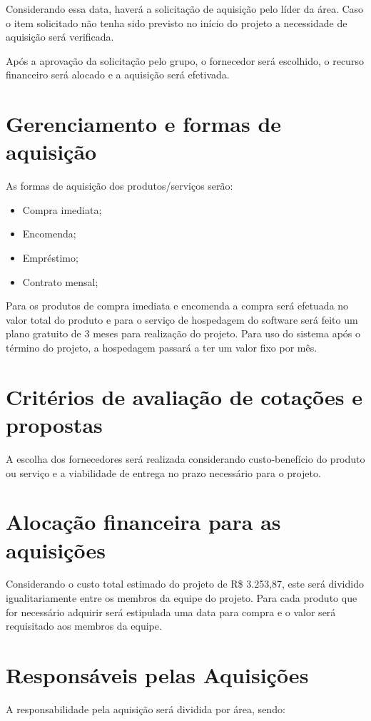 \begin{apendicesenv}
Considerando essa data, haverá a solicitação de aquisição pelo líder da área. Caso o item solicitado não tenha sido previsto no início do projeto a necessidade de aquisição será verificada. 

Após a aprovação da solicitação pelo grupo, o fornecedor será escolhido, o recurso financeiro será alocado e a aquisição será efetivada.

\section*{Gerenciamento e formas de aquisição}
As formas de aquisição dos produtos/serviços serão:
\begin{itemize}
	\item Compra imediata;
    \item Encomenda;
    \item Empréstimo;
    \item Contrato mensal;
\end{itemize}
Para os produtos de compra imediata e encomenda a compra será efetuada no valor total do produto e para o serviço de hospedagem do software será feito um plano gratuito de 3 meses para realização do projeto. Para uso do sistema após o término do projeto, a hospedagem passará a ter um valor fixo por mês.

\section*{Critérios de avaliação de cotações e propostas}
\label{criterios}
A escolha dos fornecedores será realizada considerando custo-benefício do produto ou serviço e a viabilidade de entrega no prazo necessário para o projeto.   

\section*{Alocação financeira para as aquisições}
Considerando o custo total estimado do projeto de R\$ 3.253,87, este será dividido igualitariamente entre os membros da equipe do projeto. Para cada produto que for necessário adquirir será estipulada uma data para compra e o valor será requisitado aos membros da equipe.

\section*{Responsáveis pelas Aquisições}
A responsabilidade pela aquisição será dividida por área, sendo:


\end{apendicesenv}
